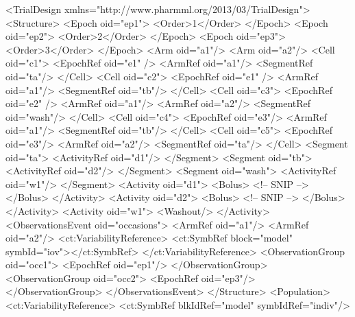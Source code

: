 \documentclass[a4paper,10pt]{article}
\begin{document}
\begin{xmlcode}
    <TrialDesign xmlns="http://www.pharmml.org/2013/03/TrialDesign">
        <Structure>
            <Epoch oid="ep1">
                <Order>1</Order>
            </Epoch>
            <Epoch oid="ep2">
                <Order>2</Order>
            </Epoch>
            <Epoch oid="ep3">
                <Order>3</Order>
            </Epoch>
            <Arm oid="a1"/>
            <Arm oid="a2"/>
            <Cell oid="c1">
                <EpochRef oid="e1" />
                <ArmRef oid="a1"/>
                <SegmentRef oid="ta"/>
            </Cell>
            <Cell oid="c2">
                <EpochRef oid="e1" />
                <ArmRef oid="a1"/>
                <SegmentRef oid="tb"/>
            </Cell>
            <Cell oid="c3">
                <EpochRef oid="e2" />
                <ArmRef oid="a1"/>
                <ArmRef oid="a2"/>
                <SegmentRef oid="wash"/>
            </Cell>
            <Cell oid="c4">
                <EpochRef oid="e3"/>
                <ArmRef oid="a1"/>
                <SegmentRef oid="tb"/>
            </Cell>
            <Cell oid="c5">
                <EpochRef oid="e3"/>
                <ArmRef oid="a2"/>
                <SegmentRef oid="ta"/>
            </Cell>
            <Segment oid="ta">
                <ActivityRef oid="d1"/>
            </Segment>
            <Segment oid="tb">
                <ActivityRef oid="d2"/>
            </Segment>
            <Segment oid="wash">
                <ActivityRef oid="w1"/>
            </Segment>
            <Activity oid="d1">
                <Bolus>
                <!-- SNIP -->
                </Bolus>
            </Activity>
            <Activity oid="d2">
                <Bolus>
                <!-- SNIP -->
                </Bolus>
            </Activity>
            <Activity oid="w1">
                <Washout/>
            </Activity>
            <ObservationsEvent oid="occasions">
                <ArmRef oid="a1"/>
                <ArmRef oid="a2"/>
                <ct:VariabilityReference>
                    <ct:SymbRef block="model" symbId="iov"></ct:SymbRef>
                </ct:VariabilityReference>
                <ObservationGroup oid="occ1">
                    <EpochRef oid="ep1"/>
                </ObservationGroup>
                <ObservationGroup oid="occ2">
                    <EpochRef oid="ep3"/>
                </ObservationGroup>
            </ObservationsEvent>
        </Structure>
        <Population>
            <ct:VariabilityReference>
                <ct:SymbRef blkIdRef="model" symbIdRef="indiv"/>

\end{xmlcode}
\end{document}
